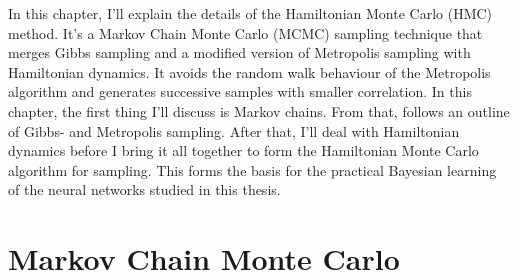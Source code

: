 In this chapter, I'll explain the details of the Hamiltonian Monte Carlo (HMC) method.
It's a Markov Chain Monte Carlo (MCMC) sampling technique that merges Gibbs sampling and a modified version of Metropolis sampling
with Hamiltonian dynamics. It avoids the random walk behaviour of the Metropolis algorithm
and generates successive samples with smaller correlation. In this chapter, the first thing I'll discuss is Markov chains.
From that, follows an outline of Gibbs- and Metropolis sampling. After that, I'll deal with Hamiltonian dynamics before I bring it all together
to form the Hamiltonian Monte Carlo algorithm for sampling. This forms the basis for the practical Bayesian learning of the neural networks studied in this thesis.

\section{Markov Chain Monte Carlo}\label{sec:mcmc}
\begin{comment}
  The treatment of Markov chains largely follows the presentation in \cite{markov_chains}. A Markov process is a scheme that from a given state (or value) $\mu$ generates a new state $\nu$ with a \textit{transition} probability $T(\nu|\mu)$. A Markov process has the following properties
\begin{itemize}
  \item The transition probabilities $T(\nu|\mu)$ are time-independent.
  \item $T(\nu|\mu)$ only depend on the states $\mu$ and $\nu$.
  \item The transition $\mu \to \mu$ is allowed, thus $T(\mu|\mu) > 0$. Hence, the new generated state may just be the same as the previous state.
  \item The transition probabilties must sum to unity, hence $\int_{\nu} T(\nu|\mu) = 1$. In other words, the procedure must generate some new state.
\end{itemize}

Two important principles, originally found by Metropolis et. al \cite{metropolis}, were introduced to make the MCMC chains computationally feasible. 
\begin{enumerate}
  \item \textbf{Ergodicity}: Any state $\nu$ can be reached from any other state $\mu$ given a long enough MCMC chain.
  \item \textbf{Detailed balance}: If the transition probabilities $T(\nu|\mu)$ obey the detailed balance equation, $$P(\mu)T(\nu|\mu) = P(\nu)T(\mu|\nu),$$
      then the Markov chain is guaranteed to be ergodic. The interpretation of this is that on average, the system makes the transition $\mu \to \nu$ just as often as the transition $\nu \to \mu$.
\end{enumerate}
\end{comment}

